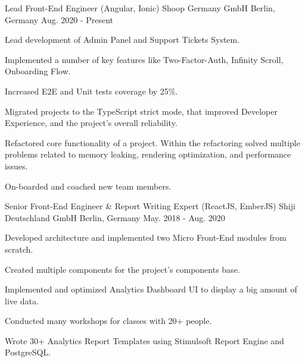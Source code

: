 

\begin{cventries}

  \cventry
    {Lead Front-End Engineer (Angular, Ionic)} %
    {Shoop Germany GmbH} %
    {Berlin, Germany} %
    {Aug. 2020 - Present} %
    {
      \begin{cvitems} %
        \item {Lead development of Admin Panel and Support Tickets System.}
        \item {Implemented a number of key features like Two-Factor-Auth, Infinity Scroll, Onboarding Flow.}
        \item {Increased E2E and Unit tests coverage by 25\%.}
        \item {Migrated projects to the TypeScript strict mode, that improved Developer Experience, and the project’s overall reliability.}
        \item {Refactored core functionality of a project. Within the refactoring solved multiple problems related to memory leaking, rendering optimization, and performance issues.}
        \item {On-boarded and coached new team members.}
      \end{cvitems}
    }

  \cventry
    {Senior Front-End Engineer \& Report Writing Expert (ReactJS, EmberJS)} %
    {Shiji Deutschland GmbH} %
    {Berlin, Germany} %
    {May. 2018 - Aug. 2020} %
    {
      \begin{cvitems} %
        \item {Developed architecture and implemented two Micro Front-End modules from scratch.}
        \item {Created multiple components for the project's components base.}
        \item {Implemented and optimized Analytics Dashboard UI to display a big amount of live data.}
        \item {Conducted many workshops for classes with 20+ people.}
        \item {Wrote 30+ Analytics Report Templates using Stimulsoft Report Engine and PostgreSQL.}
      \end{cvitems}
    }


\end{cventries}
